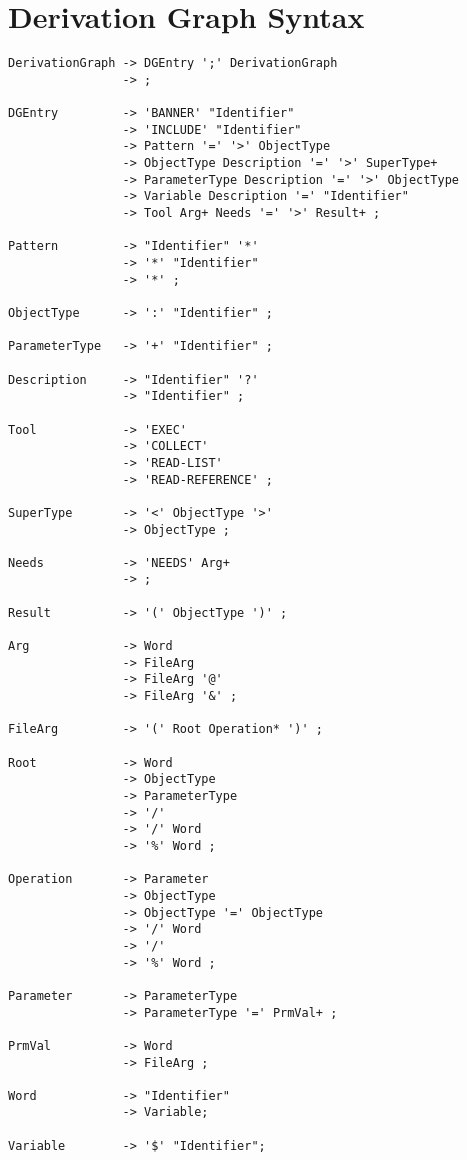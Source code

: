 \chapter{Derivation Graph Syntax}

\begin{verbatim}
DerivationGraph -> DGEntry ';' DerivationGraph
                -> ;

DGEntry         -> 'BANNER' "Identifier"
                -> 'INCLUDE' "Identifier"
                -> Pattern '=' '>' ObjectType
                -> ObjectType Description '=' '>' SuperType+
                -> ParameterType Description '=' '>' ObjectType
                -> Variable Description '=' "Identifier"
                -> Tool Arg+ Needs '=' '>' Result+ ;

Pattern         -> "Identifier" '*'
                -> '*' "Identifier"
                -> '*' ;

ObjectType      -> ':' "Identifier" ;

ParameterType   -> '+' "Identifier" ;

Description     -> "Identifier" '?'
                -> "Identifier" ;

Tool            -> 'EXEC'
                -> 'COLLECT'
                -> 'READ-LIST'
                -> 'READ-REFERENCE' ;

SuperType       -> '<' ObjectType '>'
                -> ObjectType ;

Needs           -> 'NEEDS' Arg+
                -> ;

Result          -> '(' ObjectType ')' ;

Arg             -> Word
                -> FileArg
                -> FileArg '@'
                -> FileArg '&' ;

FileArg         -> '(' Root Operation* ')' ;

Root            -> Word
                -> ObjectType
                -> ParameterType
                -> '/'
                -> '/' Word
                -> '%' Word ;

Operation       -> Parameter
                -> ObjectType
                -> ObjectType '=' ObjectType
                -> '/' Word
                -> '/'
                -> '%' Word ;

Parameter       -> ParameterType
                -> ParameterType '=' PrmVal+ ;

PrmVal          -> Word
                -> FileArg ;

Word            -> "Identifier"
                -> Variable;

Variable        -> '$' "Identifier";
\end{verbatim}

